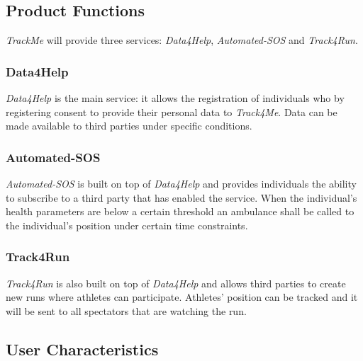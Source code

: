 \documentclass[a4paper]{article}
\begin{document}
    \subsection{Product Functions}
    \textit{TrackMe} will provide three services: \textit{Data4Help}, \textit{Automated-SOS} and \textit{Track4Run}.
    
    \subsubsection{Data4Help}
    \textit{Data4Help} is the main service: it allows the registration of individuals who by registering consent to provide their personal data to \textit{Track4Me}. Data can be made available to third parties under specific conditions.
    
    \subsubsection{Automated-SOS}
    \textit{Automated-SOS} is built on top of \textit{Data4Help} and provides individuals the ability to subscribe to a third party that has enabled the service. When the individual's health parameters are below a certain threshold an ambulance shall be called to the individual's position under certain time constraints.
    
    \subsubsection{Track4Run}
    \textit{Track4Run} is also built on top of \textit{Data4Help} and allows third parties to create new runs where athletes can participate. Athletes' position can be tracked and it will be sent to all spectators that are watching the run.
    
    \subsection{User Characteristics}
    
\end{document}
